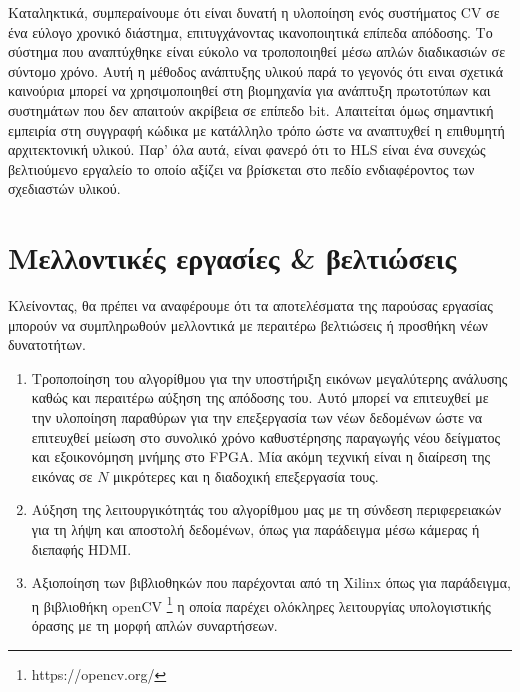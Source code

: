 Καταληκτικά, συμπεραίνουμε ότι είναι δυνατή η υλοποίηση ενός συστήματος CV σε ένα εύλογο χρονικό διάστημα, επιτυγχάνοντας ικανοποιητικά επίπεδα απόδοσης. Το σύστημα που αναπτύχθηκε είναι εύκολο να τροποποιηθεί μέσω απλών διαδικασιών σε σύντομο χρόνο. Αυτή η μέθοδος ανάπτυξης υλικού παρά το γεγονός ότι ειναι σχετικά καινούρια μπορεί να χρησιμοποιηθεί στη βιομηχανία για ανάπτυξη πρωτοτύπων και συστημάτων που δεν απαιτούν ακρίβεια σε επίπεδο bit. Απαιτείται όμως σημαντική εμπειρία στη συγγραφή κώδικα με κατάλληλο τρόπο ώστε να αναπτυχθεί η επιθυμητή αρχιτεκτονική υλικού. Παρ' όλα αυτά, είναι φανερό ότι το HLS είναι ένα συνεχώς βελτιούμενο εργαλείο το οποίο αξίζει να βρίσκεται στο πεδίο ενδιαφέροντος των σχεδιαστών υλικού.

\section{Μελλοντικές εργασίες \& βελτιώσεις}

Κλείνοντας, θα πρέπει να αναφέρουμε ότι τα αποτελέσματα της παρούσας εργασίας μπορούν να συμπληρωθούν μελλοντικά με περαιτέρω βελτιώσεις ή προσθήκη νέων δυνατοτήτων.
\begin{enumerate}
	\item Τροποποίηση του αλγορίθμου για την υποστήριξη εικόνων μεγαλύτερης ανάλυσης καθώς και περαιτέρω αύξηση της απόδοσης του. Αυτό μπορεί να επιτευχθεί με την υλοποίηση παραθύρων για την επεξεργασία των νέων δεδομένων ώστε να επιτευχθεί μείωση στο συνολικό χρόνο καθυστέρησης παραγωγής νέου δείγματος και εξοικονόμηση μνήμης στο FPGA. Μία ακόμη τεχνική είναι η διαίρεση της εικόνας σε $N$ μικρότερες και η διαδοχική επεξεργασία τους.
	\item Αύξηση της λειτουργικότητάς του αλγορίθμου μας με τη σύνδεση περιφερειακών για τη λήψη και αποστολή δεδομένων, όπως για παράδειγμα μέσω κάμερας ή διεπαφής HDMI.
	\item Αξιοποίηση των βιβλιοθηκών που παρέχονται από τη Xilinx όπως για παράδειγμα, η βιβλιοθήκη openCV \footnote{https://opencv.org/} η οποία παρέχει ολόκληρες λειτουργίας υπολογιστικής όρασης με τη μορφή απλών συναρτήσεων.
\end{enumerate}
